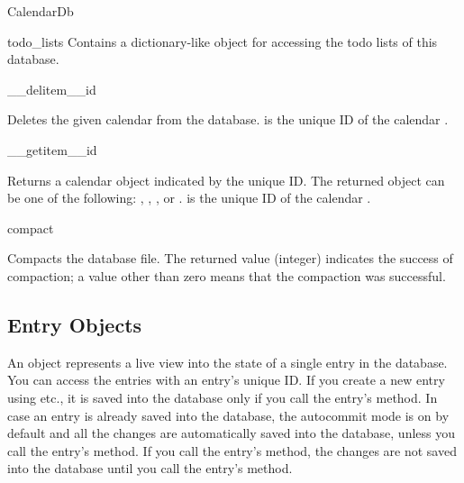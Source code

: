 \begin{classdesc*}{CalendarDb}
\begin{memberdesc}[CalendarDb]{todo_lists}
Contains a dictionary-like  object for accessing
the todo lists of this database.

\end{memberdesc}

\begin{methoddesc}[CalendarDb]{__delitem__}{id}

Deletes the given calendar  from the database.  is the 
unique ID of the calendar .

\end{methoddesc}

\begin{methoddesc}[CalendarDb]{__getitem__}{id}

Returns a calendar  object indicated by the unique ID. The returned 
object can be one of the following: , 
, , or .  is 
the unique ID of the calendar . 

\end{methoddesc}

\begin{methoddesc}[CalendarDb]{compact}{}

Compacts the database file. The returned value (integer) indicates the 
success of compaction; a value other than zero means that the compaction was 
successful.

\end{methoddesc}

\end{classdesc*}

\subsection{Entry Objects}
\label{subsec:entry}

An  object represents a live view into the state of a single 
entry in the database. You can access the entries with an entry's unique ID. 
If you create a new entry using  etc., it is 
saved into the database only if you call the entry's  method. 
In case an entry is already saved into the database, the autocommit mode is 
on by default and all the changes are automatically saved into the database, 
unless you call the entry's  method. If you call the entry's 
 method, the changes are not saved into the database until you 
call the entry's  method. 

